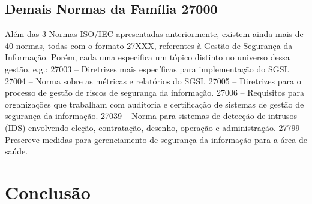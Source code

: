 \documentclass[12pt]{article}
\begin{document}
\subsection{Demais Normas da Família 27000}
Além das 3 Normas ISO/IEC apresentadas anteriormente, existem ainda mais de 40 normas, todas com o formato 27XXX, referentes à Gestão de Segurança da Informação.
Porém, cada uma especifica um tópico distinto no universo dessa gestão, e.g.:
27003 – Diretrizes mais específicas para implementação do SGSI.
27004 – Norma sobre as métricas e relatórios do SGSI.
27005 – Diretrizes para o processo de gestão de riscos de segurança da informação.
27006 – Requisitos para organizações que trabalham com auditoria e certificação de sistemas de gestão de segurança da informação.
27039 – Norma para sistemas de detecção de intrusos (IDS) envolvendo eleção, contratação, desenho, operação e administração.
27799 – Prescreve medidas para gerenciamento de segurança da informação para a área de saúde.
\section{Conclusão}


\newpage



\end{document}
